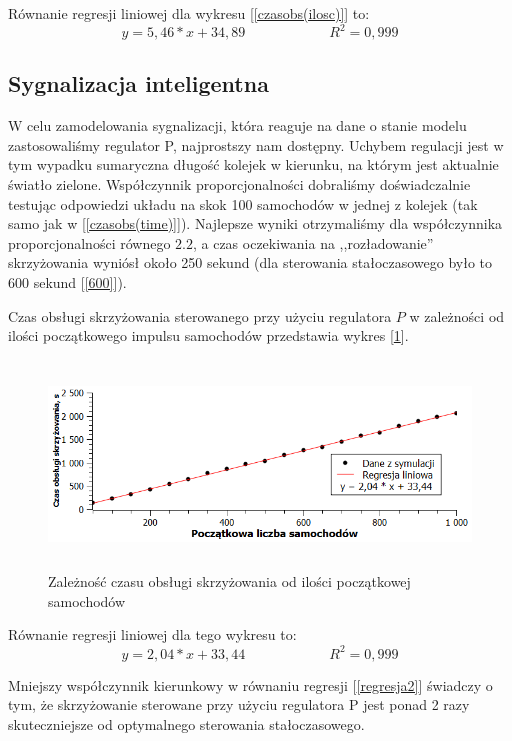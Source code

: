 \documentclass[11pt]{aghdpl}
\begin{document}
Równanie regresji liniowej dla wykresu [\ref{czasobs(ilosc)}] to:
\begin{equation}
	 y = 5,46 * x + 34,89 \qquad \qquad \qquad R^2 = 0,999
\end{equation}

\subsection{Sygnalizacja inteligentna}
W celu zamodelowania sygnalizacji, która reaguje na dane o stanie modelu zastosowaliśmy regulator P, najprostszy nam dostępny. Uchybem regulacji jest w tym wypadku sumaryczna długość kolejek w kierunku, na którym jest aktualnie światło zielone.
Współczynnik proporcjonalności dobraliśmy doświadczalnie testując odpowiedzi układu na skok 100 samochodów w jednej z kolejek (tak samo jak w [\ref{czasobs(time)}]). Najlepsze wyniki otrzymaliśmy dla współczynnika proporcjonalności równego $2.2$, a czas oczekiwania na ,,rozładowanie'' skrzyżowania wyniósł około 250 sekund (dla sterowania stałoczasowego było to 600 sekund [\ref{600}]).

Czas obsługi skrzyżowania sterowanego przy użyciu regulatora $P$ w zależności od ilości początkowego impulsu samochodów przedstawia wykres [\ref{czasobs(ilosc)2}].

\newpage

\begin{figure}[h!]
	\centering
	\includegraphics[height=55mm]{czasobs(ilosc)2.png}
	\caption{Zależność czasu obsługi skrzyżowania od ilości początkowej samochodów}	
	\label{czasobs(ilosc)2}
\end{figure}

Równanie regresji liniowej dla tego wykresu to:
\begin{equation}
	 y = 2,04 * x + 33,44 \qquad \qquad \qquad R^2 = 0,999 
	 \label{regresja2}
\end{equation}

Mniejszy współczynnik kierunkowy w równaniu regresji [\ref{regresja2}] świadczy o tym, że skrzyżowanie sterowane przy użyciu regulatora P jest ponad 2 razy skuteczniejsze od optymalnego sterowania stałoczasowego.
\end{document}
